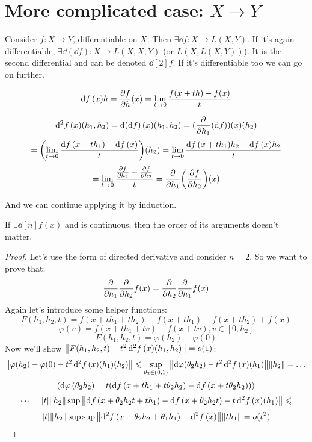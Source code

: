 \section*{More complicated case: $X \to Y$}
Consider $f: X \to Y$, differentiable on $X$. Then $\exists \dd{f}: X \to L(X, Y)$.
If it's again differentiable, $\exists \dd(\dd{f}): X \to L(X, X, Y)$ (or $L(X, L(X, Y))$). 
It is the second differential and can be denoted $\dd[2]{f}$. If it's differentiable too we can go on further.

\begin{thr}
    \[\dd{f}(x)h = \pdv{f}{h}\/(x) = \lim\limits_{t \to 0} \frac{f(x + th) - f(x)}{t}\]
\end{thr}

\begin{thr}
    \[\dd[2]{f}(x)(h_1, h_2) = \dd(\dd{f})(x)(h_1, h_2) = (\pdv{h_1}(\dd{f}))(x)(h_2) \]
    \[ = \qty(\lim\limits_{t \to 0} \frac{\dd{f}(x + th_1) - \dd{f}(x)}{t})(h_2) = \lim\limits_{t \to 0} \frac{\dd{f}(x + th_1)h_2 - \dd{f}(x)h_2}{t} \]
    \[ = \lim\limits_{t \to 0} \frac{\pdv{f}{h_2}(x+th_1) - \pdv{f}{h_2}(x)}{t} = \pdv{h_1}\qty(\pdv{f}{h_2})(x) \]
\end{thr}
And we can continue applying it by induction.

\begin{thr}
    If $\exists \dd[n]{f}(x)$ and is continuous, then the order of its arguments doesn't matter.
\end{thr}
\begin{proof}
    Let's use the form of directed derivative and consider $n = 2$. So we want to prove that:
    \[ \pdv{h_1} \pdv{h_2} f(x) = \pdv{h_2} \pdv{h_1} f(x) \]
    Again let's introduce some helper functions:
    \[ F(h_1, h_2, t) = f(x + th_1 + th_2) - f(x + th_1) - f(x + th_2) + f(x) \] 
    \[ \varphi(v) = f(x + th_1 + tv) - f(x + tv), v \in [0, h_2] \] 
    \[ F(h_1, h_2, t) = \varphi(h_2) - \varphi(0) \]
    Now we'll show $\norm{F(h_1, h_2, t) - t^2 \dd[2]{f}(x)(h_1, h_2)} = o(1)$:
    \[ \norm{\varphi(h_2) - \varphi(0) - t^2 \dd[2]{f}(x)(h_1)(h_2)} \leqslant
      \sup\limits_{\theta_2 \in (0, 1)} \norm{\dd{\varphi(\theta_2 h_2) - t^2\dd[2]{f}(x)(h_1)} } \norm{h_2} = \dots \]
    \[ \qty( \dd{\varphi}(\theta_2 h_2) = t(\dd{f}(x + th_1 + t \theta_2 h_2) - \dd{f}(x + t \theta_2 h_2)) ) \] 
    \[ \dots = \abs{t}\norm{h_2} \sup \norm{\dd{f}(x + \theta_2 h_2 t + th_1) - \dd{f}(x + \theta_2 h_2 t) - t \dd[2]{f}(x)(h_1)} \leqslant \]
    \[ \abs{t}\norm{h_2} \sup \sup \norm{ \dd[2]{f}(x + \theta_2 h_2 + \theta_1 h_1) - \dd[2]{f}(x)}\norm{th_1} = o(t^2) \]

\end{proof}

